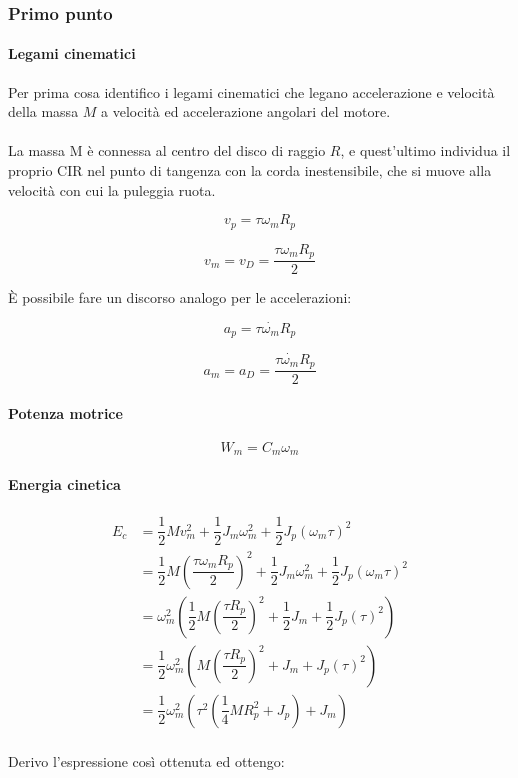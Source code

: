 \documentclass[main.tex]{subfiles}
\begin{document}
\subsubsection{Primo punto}
\paragraph{Legami cinematici}
Per prima cosa identifico i legami cinematici che legano accelerazione e velocità della massa $M$ a velocità ed accelerazione angolari del motore.
\\
\\
La massa M è connessa al centro del disco di raggio $R$, e quest'ultimo individua il proprio CIR nel punto di tangenza con la corda inestensibile, che si muove alla velocità con cui la puleggia ruota.

\[
	v_p = \tau \omega_m R_p
\]

\[
	v_m = v_D = \dfrac{\tau \omega_m R_p}{2}
\]

È possibile fare un discorso analogo per le accelerazioni:

\[
	a_p = \tau \dot{\omega_m} R_p
\]

\[
	a_m = a_D = \dfrac{\tau \dot{\omega_m} R_p}{2}
\]

\paragraph{Potenza motrice}
\[
	W_m = C_m\omega_m
\]

\paragraph{Energia cinetica}

\begin{align*}
	E_c &= \dfrac{1}{2}Mv_m^2 + \dfrac{1}{2}J_m\omega_m^2 + \dfrac{1}{2}J_p(\omega_m \tau)^2\\
	      &= \dfrac{1}{2}M(\dfrac{\tau \omega_m R_p}{2})^2 + \dfrac{1}{2}J_m\omega_m^2 + \dfrac{1}{2}J_p(\omega_m \tau)^2\\
	      &= \omega_m^2(\dfrac{1}{2}M(\dfrac{\tau  R_p}{2})^2 + \dfrac{1}{2}J_m + \dfrac{1}{2}J_p(\tau)^2)\\
	      &= \dfrac{1}{2}\omega_m^2(M(\dfrac{\tau  R_p}{2})^2 + J_m + J_p(\tau)^2)\\
	      &= \dfrac{1}{2}\omega_m^2(\tau^2(\dfrac{1}{4}M R_p^2 + J_p) +  J_m)\\
\end{align*}

Derivo l'espressione così ottenuta ed ottengo:
\end{document}
